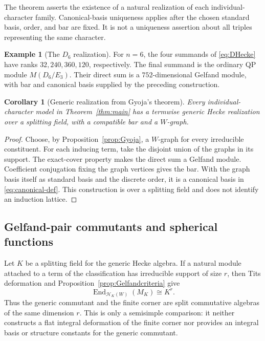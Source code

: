 \documentclass[11pt]{article}
\numberwithin{equation}{section}
\newtheorem{corollary}[theorem]{Corollary}
\theoremstyle{definition}
\newtheorem{example}[theorem]{Example}
\newcommand{\HH}{\mathcal H}
\begin{document}
The theorem asserts the existence of a natural realization of each individual-character family.
Canonical-basis uniqueness applies after the chosen standard basis, order, and bar are fixed.
It is not a uniqueness assertion about all triples representing the same character.

\begin{example}[The \(D_6\) realization]
For \(n=6\), the four summands of \eqref{eq:DHecke} have ranks \(32,240,360,120\), respectively.
The final summand is the ordinary QP module \(M(D_6/E_3)\).
Their direct sum is a \(752\)-dimensional Gelfand module, with bar and canonical basis supplied by the preceding construction.
\end{example}



\begin{corollary}[Generic realization from Gyoja's theorem]\label{prop:allHecke}
Every individual-character model in Theorem~\ref{thm:main} has a termwise generic Hecke realization over a splitting field, with a compatible bar and a \(W\)-graph.
\end{corollary}
\begin{proof}
Choose, by Proposition~\ref{prop:Gyoja}, a \(W\)-graph for every irreducible constituent.
For each inducing term, take the disjoint union of the graphs in its support.
The exact-cover property makes the direct sum a Gelfand module.
Coefficient conjugation fixing the graph vertices gives the bar.
With the graph basis itself as standard basis and the discrete order, it is a canonical basis in \eqref{eq:canonical-def}.
This construction is over a splitting field and does not identify an induction lattice.
\end{proof}

\subsection{Gelfand-pair commutants and spherical functions}

Let \(K\) be a splitting field for the generic Hecke algebra.
If a natural module attached to a term of the classification has
irreducible support of size \(r\), then Tits deformation and
Proposition~\ref{prop:Gelfandcriteria} give
\[
 \operatorname{End}_{\HH_K(W)}(M_K)\cong K^r.
\]
Thus the generic commutant and the finite corner are split commutative
algebras of the same dimension \(r\).  This is only a semisimple
comparison: it neither constructs a flat integral deformation of the
finite corner nor provides an integral basis or structure constants for
the generic commutant.
\end{document}
